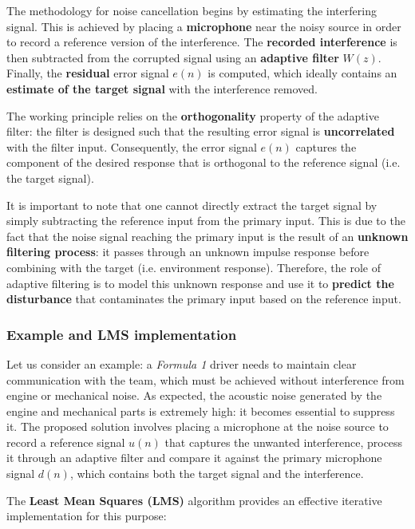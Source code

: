 The methodology for noise cancellation begins by estimating the interfering signal.
This is achieved by placing a \textbf{microphone} near the noisy source in order to record a reference version of the interference.
The \textbf{recorded interference} is then subtracted from the corrupted signal using an \textbf{adaptive filter} $W(z)$.
Finally, the \textbf{residual} error signal $e(n)$ is computed, which ideally contains an \textbf{estimate of the target signal} with the interference removed.

The working principle relies on the \textbf{orthogonality} property of the adaptive filter: the filter is designed such that the resulting error signal is \textbf{uncorrelated} with the filter input.
Consequently, the error signal $e(n)$ captures the component of the desired response that is orthogonal to the reference signal (i.e. the target signal).

It is important to note that one cannot directly extract the target signal by simply subtracting the reference input from the primary input.
This is due to the fact that the noise signal reaching the primary input is the result of an \textbf{unknown filtering process}: it passes through an unknown impulse response before combining with the target (i.e. environment response).
Therefore, the role of adaptive filtering is to model this unknown response and use it to \textbf{predict the disturbance} that contaminates the primary input based on the reference input.

\subsubsection{Example and LMS implementation}

Let us consider an example: a \textit{Formula 1} driver needs to maintain clear communication with the team, which must be achieved without interference from engine or mechanical noise.
As expected, the acoustic noise generated by the engine and mechanical parts is extremely high: it becomes essential to suppress it.
The proposed solution involves placing a microphone at the noise source to record a reference signal $u(n)$ that captures the unwanted interference, process it through an adaptive filter and compare it against the primary microphone signal $d(n)$, which contains both the target signal and the interference.

The \textbf{Least Mean Squares (LMS)} algorithm provides an effective iterative implementation for this purpose:

